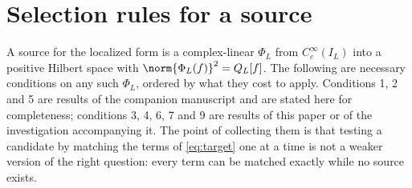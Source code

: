 \section{Selection rules for a source}\label{sec:selection}
A source for the localized form is a complex-linear $\Phi_L$ from
$C_c^\infty(I_L)$ into a positive Hilbert space with
$\norm{\Phi_L(f)}^2=Q_L[f]$. The following are necessary conditions on any such
$\Phi_L$, ordered by what they cost to apply. Conditions 1, 2 and 5 are results
of the companion manuscript and are stated here for completeness; conditions 3,
4, 6, 7 and 9 are results of this paper or of the investigation accompanying it.
The point of collecting them is that testing a candidate by matching the terms of
\eqref{eq:target} one at a time is not a weaker version of the right question:
every term can be matched exactly while no source exists.

